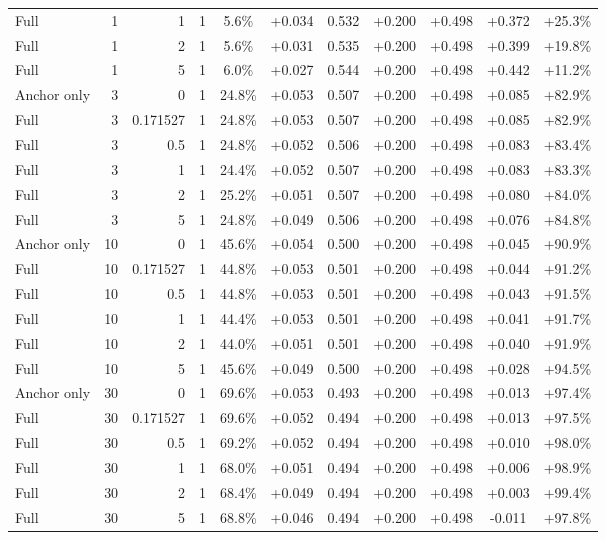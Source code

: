 \begin{table}[htbp]
\begin{tabular}{lrrrccccccc}
Full & 1 & 1 & 1 & 5.6\% & +0.034 & 0.532 & +0.200 & +0.498 & +0.372 & +25.3\% \\
Full & 1 & 2 & 1 & 5.6\% & +0.031 & 0.535 & +0.200 & +0.498 & +0.399 & +19.8\% \\
Full & 1 & 5 & 1 & 6.0\% & +0.027 & 0.544 & +0.200 & +0.498 & +0.442 & +11.2\% \\
Anchor only & 3 & 0 & 1 & 24.8\% & +0.053 & 0.507 & +0.200 & +0.498 & +0.085 & +82.9\% \\
Full & 3 & 0.171527 & 1 & 24.8\% & +0.053 & 0.507 & +0.200 & +0.498 & +0.085 & +82.9\% \\
Full & 3 & 0.5 & 1 & 24.8\% & +0.052 & 0.506 & +0.200 & +0.498 & +0.083 & +83.4\% \\
Full & 3 & 1 & 1 & 24.4\% & +0.052 & 0.507 & +0.200 & +0.498 & +0.083 & +83.3\% \\
Full & 3 & 2 & 1 & 25.2\% & +0.051 & 0.507 & +0.200 & +0.498 & +0.080 & +84.0\% \\
Full & 3 & 5 & 1 & 24.8\% & +0.049 & 0.506 & +0.200 & +0.498 & +0.076 & +84.8\% \\
Anchor only & 10 & 0 & 1 & 45.6\% & +0.054 & 0.500 & +0.200 & +0.498 & +0.045 & +90.9\% \\
Full & 10 & 0.171527 & 1 & 44.8\% & +0.053 & 0.501 & +0.200 & +0.498 & +0.044 & +91.2\% \\
Full & 10 & 0.5 & 1 & 44.8\% & +0.053 & 0.501 & +0.200 & +0.498 & +0.043 & +91.5\% \\
Full & 10 & 1 & 1 & 44.4\% & +0.053 & 0.501 & +0.200 & +0.498 & +0.041 & +91.7\% \\
Full & 10 & 2 & 1 & 44.0\% & +0.051 & 0.501 & +0.200 & +0.498 & +0.040 & +91.9\% \\
Full & 10 & 5 & 1 & 45.6\% & +0.049 & 0.500 & +0.200 & +0.498 & +0.028 & +94.5\% \\
Anchor only & 30 & 0 & 1 & 69.6\% & +0.053 & 0.493 & +0.200 & +0.498 & +0.013 & +97.4\% \\
Full & 30 & 0.171527 & 1 & 69.6\% & +0.052 & 0.494 & +0.200 & +0.498 & +0.013 & +97.5\% \\
Full & 30 & 0.5 & 1 & 69.2\% & +0.052 & 0.494 & +0.200 & +0.498 & +0.010 & +98.0\% \\
Full & 30 & 1 & 1 & 68.0\% & +0.051 & 0.494 & +0.200 & +0.498 & +0.006 & +98.9\% \\
Full & 30 & 2 & 1 & 68.4\% & +0.049 & 0.494 & +0.200 & +0.498 & +0.003 & +99.4\% \\
Full & 30 & 5 & 1 & 68.8\% & +0.046 & 0.494 & +0.200 & +0.498 & -0.011 & +97.8\% \\

\end{tabular}
\end{table}
